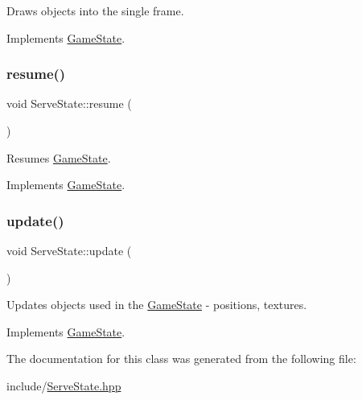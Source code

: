 Draws objects into the single frame. 



Implements \mbox{\hyperlink{class_game_state_a0d56cd5355f59a87cf95e1c6d719f329}{Game\+State}}.

\mbox{\label{class_serve_state_ae9a501a1f103b02685fdd4caac5685e5}} 
\subsubsection{\texorpdfstring{resume()}{resume()}}
{\footnotesize\ttfamily void Serve\+State\+::resume (\begin{DoxyParamCaption}{ }\end{DoxyParamCaption})\hspace{0.3cm}{\ttfamily [virtual]}}



Resumes \mbox{\hyperlink{class_game_state}{Game\+State}}. 



Implements \mbox{\hyperlink{class_game_state_a4a421c44f4dae6e9a4fbe10b6e8c47ac}{Game\+State}}.

\mbox{\label{class_serve_state_ac227c95e6d1ed3f3d1fc01c4035db847}} 
\subsubsection{\texorpdfstring{update()}{update()}}
{\footnotesize\ttfamily void Serve\+State\+::update (\begin{DoxyParamCaption}\item[{\mbox{\hyperlink{class_game_engine}{Game\+Engine}} $\ast$}]{ }\end{DoxyParamCaption})\hspace{0.3cm}{\ttfamily [virtual]}}



Updates objects used in the \mbox{\hyperlink{class_game_state}{Game\+State}} -\/ positions, textures. 



Implements \mbox{\hyperlink{class_game_state_a66b11afe355a9479f94aaf76576980bd}{Game\+State}}.



The documentation for this class was generated from the following file\+:\begin{DoxyCompactItemize}
\item 
include/\mbox{\hyperlink{_serve_state_8hpp}{Serve\+State.\+hpp}}\end{DoxyCompactItemize}
